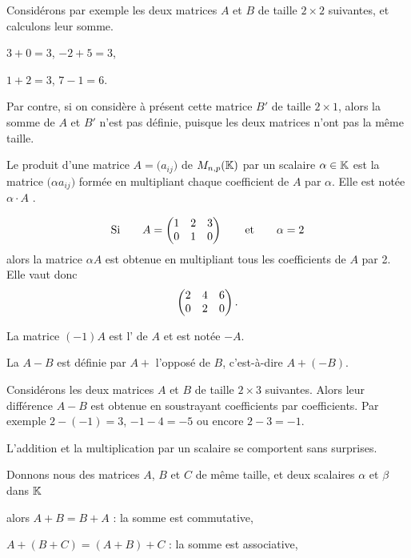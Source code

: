 \change
Considérons par exemple les deux matrices $A$ et $B$ de taille $2\times2$ suivantes, et calculons leur somme. 

\change

$3+0=3$, \quad $-2+5=3$, 

$1+2=3$, \quad $7-1=6$.

\change
Par contre, si on considère à présent cette matrice $B'$ de taille $2\times1$, alors la somme de $A$ et $B'$ n'est pas définie, puisque les deux matrices n'ont pas la même taille.



\diapo

Le produit d'une matrice $A=\big(a_{ij}\big)$ de $M_{n,p}(\mathbb{K})$ 
par un scalaire $\alpha \in \mathbb{K}$ est la matrice
$\big(\alpha a_{ij}\big)$ formée en 
multipliant chaque coefficient de $A$ par $\alpha$. Elle est notée $\alpha \cdot A$ .

\change
$$
\text{Si} \qquad 
A  = \begin{pmatrix} 
1& 2 & 3\cr 
0& 1& 0\cr
\end{pmatrix}
\qquad \text{et} \qquad \alpha = 2
$$
alors la matrice $\alpha A$ est obtenue en multipliant tous les coefficients de $A$ par 2. Elle vaut donc
$$
\begin{pmatrix} 
2& 4 & 6\cr 
0& 2& 0\cr
\end{pmatrix}.$$

\diapo

La matrice $(-1)A$ est l' de $A$ et est notée $-A$.

\change
La  $A-B$ est définie par $A+$ l'opposé de $B$, c'est-à-dire $A + (-B)$.

\change
Considérons les deux matrices $A$ et $B$ de taille $2\times3$ suivantes. 
Alors leur différence $A-B$ est obtenue en soustrayant coefficients par coefficients. 
Par exemple $2-(-1)=3$, $-1-4=-5$ ou encore $2-3=-1$.

\diapo

L'addition et la multiplication par un scalaire se comportent sans surprises. 

Donnons nous des matrices $A$, $B$ et $C$ de même taille, et deux scalaires $\alpha$ et $\beta$ dans $\mathbb{K}$

\change
alors $A + B = B + A$ : la somme est commutative,

\change
 $A + (B+C) = (A + B) + C$ : la somme est associative,

